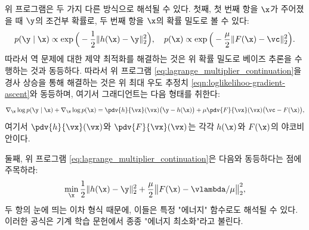 \documentclass[../../book-main_ko.tex]{subfiles}
\begin{document}
위 프로그램은 두 가지 다른 방식으로 해석될 수 있다. 첫째, 첫 번째 항을 $\x$가 주어졌을 때 $\y$의 조건부 확률로, 두 번째 항을 $\x$의 확률 밀도로 볼 수 있다:
\begin{equation}
  p(\y\mid \x) \propto \exp\Big(- \frac{1}{2}\|h(\x) - \y\|_2^2\Big), \quad
    p(\x) \propto \exp\Big( - \frac{\mu}{2}\|F(\x) - \vc\|_2^2\Big).
\end{equation}
따라서 역 문제에 대한 제약 최적화를 해결하는 것은 위 확률 밀도로 베이즈 추론을 수행하는 것과 동등하다. 따라서 위 프로그램 \eqref{eq:lagrange_multiplier_continuation}을 경사 상승을 통해 해결하는 것은 위 최대 우도 추정치 \eqref{eqn:loglikelihoo-gradient-ascent}와 동등하며, 여기서 그래디언트는 다음 형태를 취한다:
\begin{equation}
   \nabla_{\x} \log p(\y \mid \x) + \nabla_{\x} \log p(\x)   =  \pdv{h}{\vx}(\vx)\big(\y - h(\x)\big) + \mu \pdv{F}{\vx}(\vx)\big(\vc - F(\x)\big),
\end{equation}
여기서 $\pdv{h}{\vx}(\vx)$와 $\pdv{F}{\vx}(\vx)$는 각각 $h(\x)$와 $F(\x)$의 야코비안이다.

둘째, 위 프로그램 \eqref{eq:lagrange_multiplier_continuation}은 다음와 동등하다는 점에 주목하라:
\begin{equation}
\min_{\x} \frac{1}{2}\|h(\x) - \y\|_2^2 + \frac{\mu}{2} \big\|F(\x) - \vlambda/\mu\big\|_2^2,
\label{eqn:energy-minimization}
\end{equation}
두 항의 눈에 띄는 이차 형식 때문에, 이들은 특정 "에너지" 함수로도 해석될 수 있다. 이러한 공식은 기계 학습 문헌에서 종종 "에너지 최소화"라고 불린다.
\end{document}
